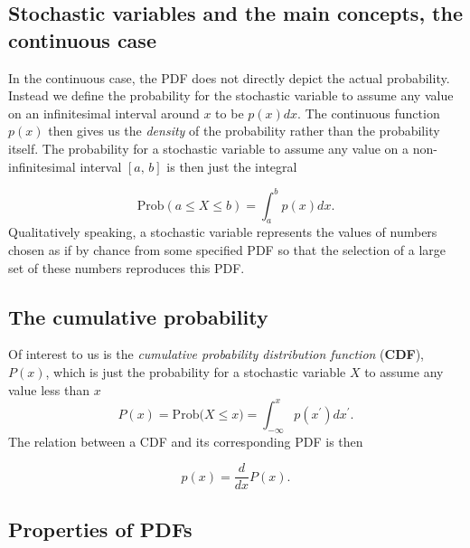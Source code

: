 \documentclass[%
oneside,                 %
final,                   %
10pt]{article}
\newenvironment{block_mdfboxadmon}[1][]{
\begin{block_mdfboxmdframed}[frametitle=#1]
}
{
\end{block_mdfboxmdframed}
}
\begin{document}
\subsection{Stochastic variables and the main concepts, the continuous case}

\begin{block_mdfboxadmon}[]
In the continuous case, the PDF does not directly depict the
actual probability. Instead we define the probability for the
stochastic variable to assume any value on an infinitesimal interval
around $x$ to be $p(x)dx$. The continuous function $p(x)$ then gives us
the \emph{density} of the probability rather than the probability
itself. The probability for a stochastic variable to assume any value
on a non-infinitesimal interval $[a,\,b]$ is then just the integral

\begin{equation*}
\mathrm{Prob}(a\leq X\leq b) = \int_a^b p(x)dx.
\end{equation*}
Qualitatively speaking, a stochastic variable represents the values of
numbers chosen as if by chance from some specified PDF so that the
selection of a large set of these numbers reproduces this PDF.
\end{block_mdfboxadmon} %



\subsection{The cumulative probability}

\begin{block_mdfboxadmon}[]
Of interest to us is the \emph{cumulative probability
distribution function} (\textbf{CDF}), $P(x)$, which is just the probability
for a stochastic variable $X$ to assume any value less than $x$
\begin{equation*}
P(x)=\mathrm{Prob(}X\leq x\mathrm{)} =
\int_{-\infty}^x p(x^{\prime})dx^{\prime}.
\end{equation*}
The relation between a CDF and its corresponding PDF is then

\begin{equation*}
p(x) = \frac{d}{dx}P(x).
\end{equation*}
\end{block_mdfboxadmon} %



\subsection{Properties of PDFs}
\end{document}
